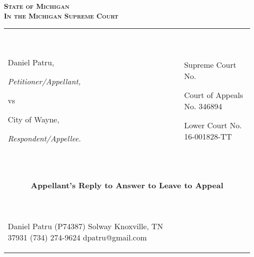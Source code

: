 \documentclass[12pt,\documentclassflag]{michiganCourtOfAppealsBrief}
\begin{document}
\begin{centering}
\bf\scshape State of Michigan\\In the Michigan Supreme Court

\rm 

\makeandtab
\setlength{\tabcolsep}{20pt}%
\begin{tabular}{p{} p{}}
  {~

  \raggedright Daniel Patru,\par
  \hfill\textit{Petitioner/Appellant,}
  \vspace{.5\baselineskip}\par
  vs\par
  \vspace{.5\baselineskip}
  \raggedright City of Wayne,\par
  \hfill\textit{Respondent/Appellee.}
  
  ~} &  {~
       \par\par
       Supreme Court No. \underline{\hspace{5em}}\par
       Court of Appeals No. 346894\par
       Lower Court No. 16-001828-TT\par\vspace{\baselineskip}

  ~}
  \\ \cline{1-2}\vspace{2mm}\\

  \vspace{3em}\\
  
  \multicolumn{2}{c}{\textbf{Appellant's Reply to Answer to Leave to Appeal}}\\
  {~ 
  \vspace{3em}
  
  Daniel Patru (P74387) \newline%
  3309 Solway\newline%
  Knoxville, TN 37931\newline%
  (734) 274-9624\newline%
  dpatru@gmail.com\newline\newline%
  ~} & {~ %
       \vspace{3em}
       
}
\end{tabular}
\end{centering}
\end{document}
